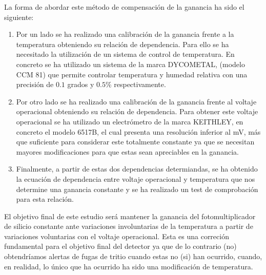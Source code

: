 La forma de abordar este método de compensación de la ganancia ha sido el siguiente:
\begin{enumerate}
\item {} 
Por un lado se ha realizado una calibración de la ganancia frente a la temperatura obteniendo su relación de dependencia. Para ello se ha necesitado la utilización de un sistema de control de temperatura. En concreto se ha utilizado un sistema de la marca DYCOMETAL, (modelo CCM 81) que permite controlar temperatura y humedad relativa con una precisión de $0.1$ grados  y  $0.5$\% respectivamente.

\item {} Por otro lado se ha realizado una calibración de la ganancia frente al voltaje operacional obteniendo su relación de dependencia. Para obtener este voltaje operacional se ha utilizado un electrómetro de la marca KEITHLEY, en concreto el modelo 6517B, el cual presenta una resolución inferior al mV, más que suficiente para considerar este totalmente constante ya que se necesitan mayores modificaciones para que estas sean apreciables en la ganancia.

\item {} Finalmente, a partir de estas dos dependencias determiandas, se ha obtenido la ecuación de dependencia entre voltaje operacional y temperatura que nos determine una ganancia constante  y se ha realizado un test de comprobación para esta relación.
\end{enumerate}

El objetivo final de este estudio será mantener la ganancia del fotomultiplicador de silicio constante ante variaciones involuntarias de la temperatura a partir de variaciones voluntarias con el voltaje operacional. Esta es una correción fundamental para el objetivo final del detector ya que de lo contrario (no) obtendríamos alertas de fugas de tritio cuando estas no (si) han ocurrido, cuando, en realidad, lo único que ha ocurrido ha sido una modificación de temperatura.
